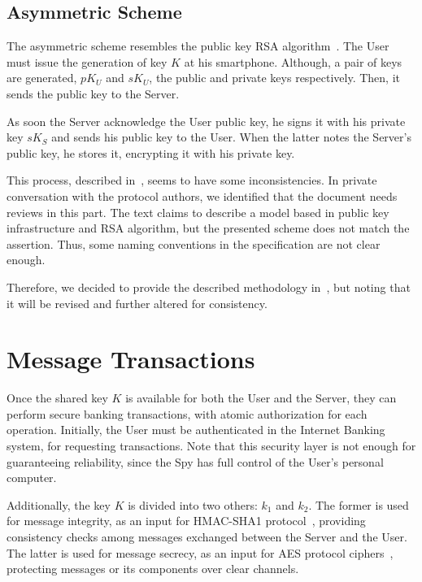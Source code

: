 \subsection{Asymmetric Scheme}
The asymmetric scheme resembles the public key RSA algorithm~\cite{RSA}. The User must issue the generation of key \(K\) at his smartphone. Although, a pair of keys are generated, \(pK_U\) and \(sK_U\), the public and private keys respectively. Then, it sends the public key to the Server.

As soon the Server acknowledge the User public key, he signs it with his private key \(sK_S\) and sends his public key to the User. When the latter notes the Server's public key, he stores it, encrypting it with his private key.

This process, described in~\cite[p.78]{Peotta2012}, seems to have some inconsistencies. In private conversation with the protocol authors, we identified that the document needs reviews in this part. The text claims to describe a model based in public key infrastructure and RSA algorithm, but the presented scheme does not match the assertion. Thus, some naming conventions in the specification are not clear enough.

Therefore, we decided to provide the described methodology in~\cite{Peotta2012}, but noting that it will be revised and further altered for consistency.





\section{Message Transactions}
Once the shared key \(K\) is available for both the User and the Server, they can perform secure banking transactions, with atomic authorization for each operation. Initially, the User must be authenticated in the Internet Banking system, for requesting transactions. Note that this security layer is not enough for guaranteeing reliability, since the Spy has full control of the User's personal computer.

Additionally, the key \(K\) is divided into two others: \(k_1\) and \(k_2\). The former is used for message integrity, as an input for HMAC-SHA1 protocol~\cite{Bellare96}, providing consistency checks among messages exchanged between the Server and the User. The latter is used for message secrecy, as an input for AES protocol ciphers~\cite{AES}, protecting messages or its components over clear channels.

